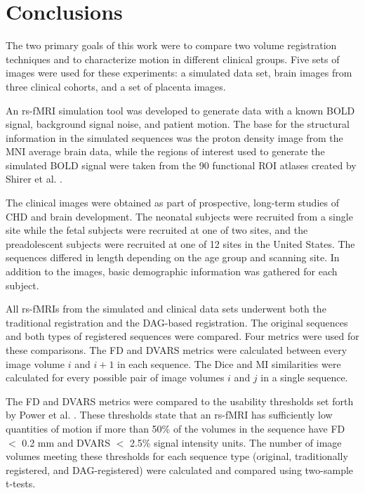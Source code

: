 \chapter{Conclusions}
\label{ch:fin}

The two primary goals of this work were to compare two volume registration techniques and to characterize motion in different clinical groups. Five sets of images were used for these experiments: a simulated data set, brain images from three clinical cohorts, and a set of placenta images. 

An rs-fMRI simulation tool was developed to generate data with a known BOLD signal, background signal noise, and patient motion. The base for the structural information in the simulated sequences was the proton density image from the MNI average brain data, while the regions of interest used to generate the simulated BOLD signal were taken from the 90 functional ROI atlases created by Shirer et al. \cite{Shirer2012}. 

The clinical images were obtained as part of prospective, long-term studies of CHD and brain development. The neonatal subjects were recruited from a single site while the fetal subjects were recruited at one of two sites, and the preadolescent subjects were recruited at one of 12 sites in the United States. The sequences differed in length depending on the age group and scanning site. In addition to the images, basic demographic information was gathered for each subject.

All rs-fMRIs from the simulated and clinical data sets underwent both the traditional registration and the DAG-based registration. The original sequences and both types of registered sequences were compared. Four metrics were used for these comparisons. The FD and DVARS metrics were calculated between every image volume $i$ and $i+1$ in each sequence. The Dice and MI similarities were calculated for every possible pair of image volumes $i$ and $j$ in a single sequence. 

The FD and DVARS metrics were compared to the usability thresholds set forth by Power et al. \cite{Power2012}. These thresholds state that an rs-fMRI has sufficiently low quantities of motion if more than 50\% of the volumes in the sequence have FD $<$ 0.2 mm and DVARS $<$ 2.5\% signal intensity units. The number of image volumes meeting these thresholds for each sequence type (original, traditionally registered, and DAG-registered) were calculated and compared using two-sample t-tests. 

